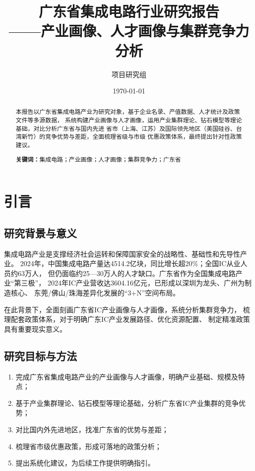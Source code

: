 \documentclass[12pt,a4paper]{ctexart}
\title{{\Huge \textbf{广东省集成电路行业研究报告}}\\[6pt]
       {\large ——产业画像、人才画像与集群竞争力分析}}
\author{项目研究组}
\date{\today}
\begin{document}
\maketitle
\thispagestyle{empty}

\begin{abstract}
\noindent
本报告以广东省集成电路产业为研究对象，基于企业名录、产值数据、人才统计及政策文件等多源数据，
系统构建产业画像与人才画像，运用产业集群理论、钻石模型等理论基础，对比分析广东省与国内先进
省市（上海、江苏）及国际领先地区（美国硅谷、台湾新竹）的竞争优势与差距，全面梳理省级与市级
优惠政策体系，最终提出针对性政策建议。

\textbf{关键词：}集成电路；产业画像；人才画像；集群竞争力；广东省
\end{abstract}

\newpage
\tableofcontents
\newpage
\listoffigures
\listoftables
\newpage

\section{引言}
\label{sec:intro}

\subsection{研究背景与意义}
\label{sec:background}

集成电路产业是支撑经济社会运转和保障国家安全的战略性、基础性和先导性产业。
2024年，中国集成电路产量达4514.2亿块，同比增长超20\%；全国IC从业人员约63万人，
但仍面临约25—30万人的人才缺口。广东省作为全国集成电路产业“第三极”，
2024年IC产业营收达3604.16亿元，已形成以深圳为龙头、广州为制造核心、
东莞/佛山/珠海差异化发展的“3+N”空间布局。

在此背景下，全面刻画广东省IC产业画像与人才画像，系统分析集群竞争力，
梳理配套政策体系，对于明确广东IC产业发展路径、优化资源配置、
制定精准政策具有重要现实意义。

\subsection{研究目标与方法}
\label{sec:objectives}

\begin{enumerate}[label=(\arabic*)]
    \item 完成广东省集成电路产业的产业画像与人才画像，明确产业基础、规模及特点；
    \item 基于产业集群理论、钻石模型等理论基础，分析广东省IC产业集群的竞争优势；
    \item 对比国内外先进地区，找准广东省的优势与差距；
    \item 梳理省市级优惠政策，形成可落地的政策分析；
    \item 提出系统化建议，为后续工作提供明确指引。
\end{enumerate}
\end{document}
